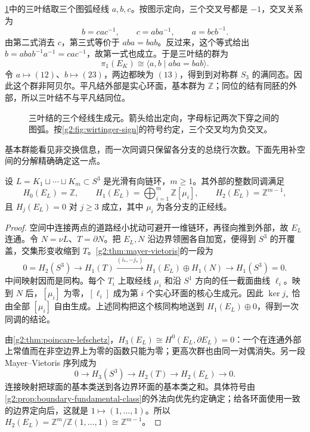 \begin{example}\label{g2:exm:trefoil-group}
	\cref{g2:fig:trefoil-wirtinger}中的三叶结取三个图弧经线 \(a,b,c\)。按图示定向，三个交叉号都是 \(-1\)，交叉关系为
	\[
		b=cac^{-1},\qquad c=aba^{-1},\qquad a=bcb^{-1}.
	\]
	由第二式消去 \(c\)，第三式等价于 \(aba=bab\)。反过来，这个等式给出 \(b=ab ab^{-1}a^{-1}=cac^{-1}\)，故第一式也成立。于是三叶结的群为
	\begin{equation}\label{g2:eq:trefoil-group}
		\pi_1(E_K)\cong\langle a,b\mid aba=bab\rangle.
	\end{equation}
	令 \(a\mapsto(12)\)、\(b\mapsto(23)\)，两边都映为 \((13)\)，得到到对称群 \(S_3\) 的满同态。因此这个群非阿贝尔。平凡结外部是实心环面，基本群为 \(\mathbb Z\)；同位的结有同胚的外部，所以三叶结不与平凡结同位。
\end{example}

\begin{figure}[htbp]
	\centering
	
	\caption[三叶结的三个经线生成元]{三叶结的三个经线生成元。箭头给出定向，字母标记两次下穿之间的图弧。按\cref{g2:fig:wirtinger-sign}的符号约定，三个交叉均为负交叉。}
	\label{g2:fig:trefoil-wirtinger}
\end{figure}

基本群能看见非交换信息，而一次同调只保留各分支的总绕行次数。下面先用补空间的分解精确确定这一点。

\begin{proposition}\label{g2:prop:link-exterior-homology}
	设 \(L=K_1\sqcup\cdots\sqcup K_m\subset S^3\) 是光滑有向链环，\(m\geq1\)。其外部的整数同调满足
	\[
		H_0(E_L)=\mathbb Z,\qquad H_1(E_L)=\bigoplus_{i=1}^m\mathbb Z[\mu_i],\qquad H_2(E_L)=\mathbb Z^{m-1},
	\]
	且 \(H_j(E_L)=0\) 对 \(j\geq3\) 成立，其中 \(\mu_i\) 为各分支的正经线。
\end{proposition}
\begin{proof}
	空间中连接两点的道路经小扰动可避开一维链环，再径向推到外部，故 \(E_L\) 连通。令 \(N=\nu L\)、\(T=\partial N\)。把 \(E_L,N\) 沿边界领圈各自加宽，便得到 \(S^3\) 的开覆盖，交集形变收缩到 \(T\)。\cref{g2:thm:mayer-vietoris}的一段为
	\[
		0=H_2(S^3)\longrightarrow H_1(T)
		\xrightarrow{(i_*,-j_*)}H_1(E_L)\oplus H_1(N)
		\longrightarrow H_1(S^3)=0.
	\]
	中间映射因而是同构。每个 \(T_i\) 上取经线 \(\mu_i\) 和沿 \(S^1\) 方向的任一截面曲线 \(\ell_i\)。映到 \(N\) 后，\([\mu_i]\) 为零，\([\ell_i]\) 成为第 \(i\) 个实心环面的核心生成元。因此 \(\ker j_*\) 恰由全部 \([\mu_i]\) 自由生成。上述同构把这个核同构地送到 \(H_1(E_L)\oplus0\)，得到一次同调的结论。

	由\cref{g2:thm:poincare-lefschetz}，\(H_3(E_L)\cong H^0(E_L,\partial E_L)=0\)：一个在连通外部上常值而在非空边界上为零的函数只能为零；更高次群也由同一对偶消失。另一段 Mayer--Vietoris 序列成为
	\[
		0\longrightarrow H_3(S^3)\longrightarrow H_2(T)
		\longrightarrow H_2(E_L)\longrightarrow0.
	\]
	连接映射把球面的基本类送到各边界环面的基本类之和。具体符号由\cref{g2:prop:boundary-fundamental-class}的外法向优先约定确定；给各环面使用一致的边界定向后，这就是 \(1\mapsto(1,\ldots,1)\)。所以 \(H_2(E_L)=\mathbb Z^m/\mathbb Z(1,\ldots,1)\cong\mathbb Z^{m-1}\)。
\end{proof}

